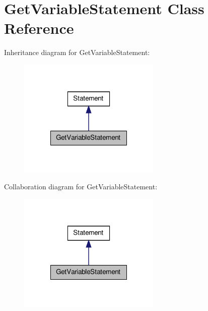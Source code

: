 \hypertarget{class_get_variable_statement}{\section{Get\-Variable\-Statement Class Reference}
\label{class_get_variable_statement}
}


Inheritance diagram for Get\-Variable\-Statement\-:
\nopagebreak
\begin{figure}[H]
\begin{center}
\leavevmode
\includegraphics[width=192pt]{class_get_variable_statement__inherit__graph}
\end{center}
\end{figure}


Collaboration diagram for Get\-Variable\-Statement\-:
\nopagebreak
\begin{figure}[H]
\begin{center}
\leavevmode
\includegraphics[width=192pt]{class_get_variable_statement__coll__graph}
\end{center}
\end{figure}
